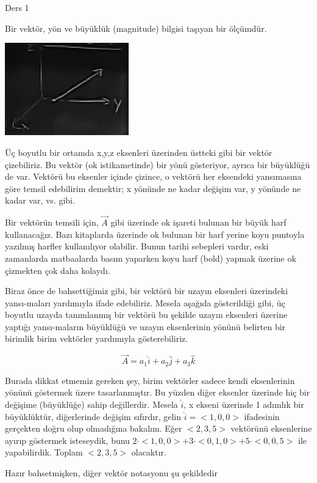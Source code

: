 \documentclass[12pt,fleqn]{article}\usepackage{../../common}
\begin{document}
Ders 1

Bir vektör, yön ve büyüklük (magnitude) bilgisi taşıyan bir ölçümdür.

\includegraphics[height=4cm]{1_1.png}

Üç boyutlu bir ortamda x,y,z eksenleri üzerinden üstteki gibi bir vektör
çizebiliriz. Bu vektör (ok istikametinde) bir yönü gösteriyor, ayrıca bir
büyüklüğü de var. Vektörü bu eksenler içinde çizince, o vektörü her
eksendeki yansımasına göre temsil edebilirim demektir; x yönünde ne kadar
değişim var, y yönünde ne kadar var, vs. gibi.

Bir vektörün temsili için, $\vec{A}$ gibi üzerinde ok işareti bulunan bir büyük
harf kullanacağız. Bazı kitaplarda üzerinde ok bulunan bir harf yerine koyu
puntoyla yazılmış harfler kullanılıyor olabilir. Bunun tarihi sebepleri vardır,
eski zamanlarda matbaalarda basım yaparken koyu harf (bold) yapmak üzerine ok
çizmekten çok daha kolaydı.

Biraz önce de bahsettiğimiz gibi, bir vektörü bir uzayın eksenleri üzerindeki
yansı-maları yardımıyla ifade edebiliriz. Mesela aşağıda gösterildiği gibi, üç
boyutlu uzayda tanımlanmış bir vektörü bu şekilde uzayın eksenleri üzerine
yaptığı yansı-maların büyüklüğü ve uzayın eksenlerinin yönünü belirten bir
birimlik birim vektörler yardımıyla gösterebiliriz.

$$
\vec{A} = a_1 \hat{i} + a_2 \hat{j} + a_3 \hat{k}
$$

Burada dikkat etmemiz gereken şey, birim vektörler sadece kendi eksenlerinin
yönünü göstermek üzere tasarlanmıştır. Bu yüzden diğer eksenler üzerinde hiç bir
değişime (büyüklüğe) sahip değillerdir. Mesela $\hat{i}$, x ekseni üzerinde 1
adımlık bir büyüklüktür, diğerlerinde değişim sıfırdır, gelin $\hat{i} = < 1,0,0 >$
ifadesinin gerçekten doğru olup olmadığına bakalım. Eğer $< 2,3,5 >$
vektörünü eksenlerine ayırıp göstermek isteseydik, bunu $2\cdot< 1,0,0 > +
3\cdot< 0,1,0 > + 5\cdot< 0,0,5 >$ ile yapabilirdik. Toplam $< 2,3,5 >$ olacaktır.

Hazır bahsetmişken, diğer vektör notasyonu şu şekildedir
\end{document}
